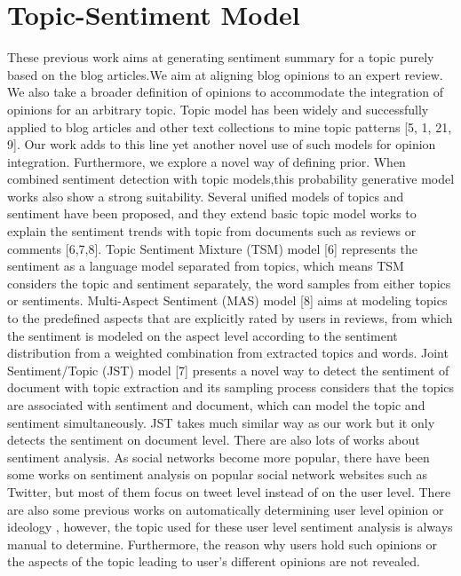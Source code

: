 \documentclass[runningheads,a4paper]{llncs}
\begin{document}
{\section{Topic-Sentiment Model}
These previous work aims at generating sentiment summary for a topic purely based on the blog articles.We aim at aligning blog opinions to an expert review. We also take a broader definition of opinions to accommodate the integration of opinions for an arbitrary topic. Topic model has been widely and successfully applied to
blog articles and other text collections to mine topic patterns [5, 1, 21, 9]. Our work adds to this line yet another novel use of such models for opinion integration. Furthermore, we explore a novel way of defining prior.
When combined sentiment detection with topic models,this probability generative model works also show a strong suitability. Several
unified models of topics and sentiment have been proposed, and they extend basic topic model works to explain the sentiment trends with topic from documents such as reviews or comments \cite{mei2007topic,lin2009joint,jo2011aspect,zhao2012user}[6,7,8]. Topic Sentiment Mixture (TSM) model [6] represents the sentiment as a language model separated from topics, which means TSM considers the topic and sentiment separately, the word samples from either topics or sentiments. Multi-Aspect Sentiment (MAS) model [8] aims at modeling topics to the predefined aspects that are explicitly rated by users in reviews, from which the sentiment is modeled on the aspect level according to the sentiment distribution from a weighted combination from extracted topics and words. Joint Sentiment/Topic (JST) model [7] presents a novel way to detect the sentiment of document with topic extraction and its sampling process considers that the topics are associated with sentiment and document, which can model the topic and sentiment simultaneously. JST takes much similar way as our work but it only detects the sentiment on document level. There are also lots of works about sentiment analysis. As social networks become more popular, there have been some works on sentiment analysis on popular social network websites such as Twitter, but most of them\cite{li2010micro,o2010tweets,barbosa2010robust,davidov2010enhanced,jiang2011target} focus on tweet level instead of on the user level. There are also some previous works on automatically determining user level opinion or ideology \cite{agrawal2003mining,mostafa2013more,malouf2008taking,yu2008classifying}, however, the topic used for these user level sentiment analysis is always manual to determine. Furthermore, the reason why users hold such opinions or the aspects of the topic leading to user’s different opinions are not revealed.

}
\end{document}
